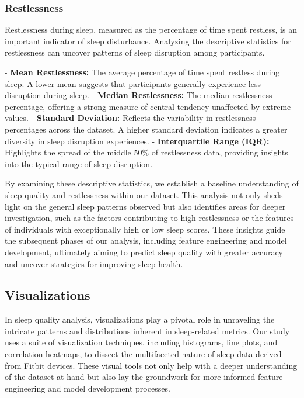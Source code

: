 \documentclass[10pt]{extarticle}
\begin{document}
\subsubsection{Restlessness}

Restlessness during sleep, measured as the percentage of time spent restless, is an important indicator of sleep disturbance. Analyzing the descriptive statistics for restlessness can uncover patterns of sleep disruption among participants.

- \textbf{Mean Restlessness:} The average percentage of time spent restless during sleep. A lower mean suggests that participants generally experience less disruption during sleep.
- \textbf{Median Restlessness:} The median restlessness percentage, offering a strong measure of central tendency unaffected by extreme values.
- \textbf{Standard Deviation:} Reflects the variability in restlessness percentages across the dataset. A higher standard deviation indicates a greater diversity in sleep disruption experiences.
- \textbf{Interquartile Range (IQR):} Highlights the spread of the middle 50\% of restlessness data, providing insights into the typical range of sleep disruption.

By examining these descriptive statistics, we establish a baseline understanding of sleep quality and restlessness within our dataset. This analysis not only sheds light on the general sleep patterns observed but also identifies areas for deeper investigation, such as the factors contributing to high restlessness or the features of individuals with exceptionally high or low sleep scores. These insights guide the subsequent phases of our analysis, including feature engineering and model development, ultimately aiming to predict sleep quality with greater accuracy and uncover strategies for improving sleep health.

\subsection{Visualizations}

In sleep quality analysis, visualizations play a pivotal role in unraveling the intricate patterns and distributions inherent in sleep-related metrics. Our study uses a suite of visualization techniques, including histograms, line plots, and correlation heatmaps, to dissect the multifaceted nature of sleep data derived from Fitbit devices. These visual tools not only help with a deeper understanding of the dataset at hand but also lay the groundwork for more informed feature engineering and model development processes.
\end{document}
